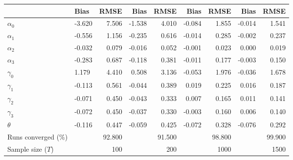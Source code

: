 
\begin{tabular}[t]{llrrrrrrr}
\toprule
  & Bias & RMSE & Bias & RMSE & Bias & RMSE & Bias & RMSE\\
\midrule
$\alpha_{0}$ & -3.620 & 7.506 & -1.538 & 4.010 & -0.084 & 1.855 & -0.014 & 1.541\\
$\alpha_{1}$ & -0.556 & 1.156 & -0.235 & 0.616 & -0.014 & 0.285 & -0.002 & 0.237\\
$\alpha_{2}$ & -0.032 & 0.079 & -0.016 & 0.052 & -0.001 & 0.023 & 0.000 & 0.019\\
$\alpha_{3}$ & -0.283 & 0.687 & -0.118 & 0.381 & -0.011 & 0.177 & -0.003 & 0.150\\
$\gamma_{0}$ & 1.179 & 4.410 & 0.508 & 3.136 & -0.053 & 1.976 & -0.036 & 1.678\\
$\gamma_{1}$ & -0.113 & 0.561 & -0.044 & 0.389 & 0.019 & 0.225 & 0.016 & 0.187\\
$\gamma_{2}$ & -0.071 & 0.450 & -0.043 & 0.333 & 0.007 & 0.165 & 0.011 & 0.141\\
$\gamma_{3}$ & -0.072 & 0.450 & -0.037 & 0.330 & -0.003 & 0.160 & 0.006 & 0.140\\
$\theta$ & -0.116 & 0.447 & -0.059 & 0.425 & -0.072 & 0.328 & -0.076 & 0.292\\
Runs converged (\%) &  & 92.800 &  & 91.500 &  & 98.800 &  & 99.900\\
Sample size ($T$) &  & 100 &  & 200 &  & 1000 &  & 1500\\
\bottomrule
\end{tabular}
